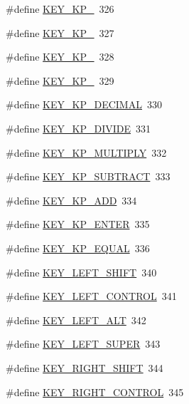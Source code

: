 \begin{DoxyCompactItemize}
\#define \hyperlink{group___keys_ga4022910cb22ec195156ec970b70bdc69}{K\-E\-Y\-\_\-\-K\-P\-\_}~326
\item 
\#define \hyperlink{group___keys_ga2919d3f1f6d7cd385062739530f6ba3a}{K\-E\-Y\-\_\-\-K\-P\-\_}~327
\item 
\#define \hyperlink{group___keys_gadf8d49bf3fe6a0140a7d5edb9c1ce96e}{K\-E\-Y\-\_\-\-K\-P\-\_}~328
\item 
\#define \hyperlink{group___keys_ga9579d60b5a593b8c8664cdb1053f71e7}{K\-E\-Y\-\_\-\-K\-P\-\_}~329
\item 
\#define \hyperlink{group___keys_gad2f19fb33ae5b0010a08a1b33b1eb82b}{K\-E\-Y\-\_\-\-K\-P\-\_\-\-D\-E\-C\-I\-M\-A\-L}~330
\item 
\#define \hyperlink{group___keys_ga072d900b0ed7b67ea8e6f6975aad52b3}{K\-E\-Y\-\_\-\-K\-P\-\_\-\-D\-I\-V\-I\-D\-E}~331
\item 
\#define \hyperlink{group___keys_gaa7d07d9793c6a06dd34f1aadb065ca12}{K\-E\-Y\-\_\-\-K\-P\-\_\-\-M\-U\-L\-T\-I\-P\-L\-Y}~332
\item 
\#define \hyperlink{group___keys_ga754e3cb8946a10d5c779c4cce7c48ff9}{K\-E\-Y\-\_\-\-K\-P\-\_\-\-S\-U\-B\-T\-R\-A\-C\-T}~333
\item 
\#define \hyperlink{group___keys_ga5b66ab871d9573dbefe48e4362ad028c}{K\-E\-Y\-\_\-\-K\-P\-\_\-\-A\-D\-D}~334
\item 
\#define \hyperlink{group___keys_gabc694590066b6b711cde73342c6ea781}{K\-E\-Y\-\_\-\-K\-P\-\_\-\-E\-N\-T\-E\-R}~335
\item 
\#define \hyperlink{group___keys_gae32218416682409e3fc6e44b00434aee}{K\-E\-Y\-\_\-\-K\-P\-\_\-\-E\-Q\-U\-A\-L}~336
\item 
\#define \hyperlink{group___keys_ga3e95e749fcf469807632dbf5dad74fa2}{K\-E\-Y\-\_\-\-L\-E\-F\-T\-\_\-\-S\-H\-I\-F\-T}~340
\item 
\#define \hyperlink{group___keys_gaa6cc994a75ed65715deead3ea5ad762d}{K\-E\-Y\-\_\-\-L\-E\-F\-T\-\_\-\-C\-O\-N\-T\-R\-O\-L}~341
\item 
\#define \hyperlink{group___keys_ga6036ee57ef02abbd7413b1fa9fe1a549}{K\-E\-Y\-\_\-\-L\-E\-F\-T\-\_\-\-A\-L\-T}~342
\item 
\#define \hyperlink{group___keys_ga538adc297392d0693acc7755bf680083}{K\-E\-Y\-\_\-\-L\-E\-F\-T\-\_\-\-S\-U\-P\-E\-R}~343
\item 
\#define \hyperlink{group___keys_ga49d666fa7e03666c2337ccc7389f3db0}{K\-E\-Y\-\_\-\-R\-I\-G\-H\-T\-\_\-\-S\-H\-I\-F\-T}~344
\item 
\#define \hyperlink{group___keys_ga2527b24b125c9b03ed346334a6be46c2}{K\-E\-Y\-\_\-\-R\-I\-G\-H\-T\-\_\-\-C\-O\-N\-T\-R\-O\-L}~345

\end{DoxyCompactItemize}
